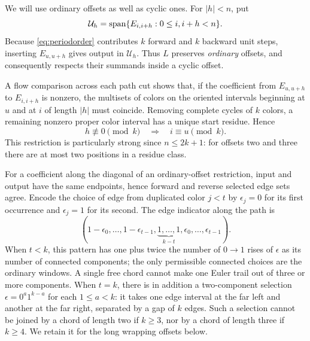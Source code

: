 We will use ordinary offsets as well as cyclic ones. For
$|h|<n$, put
\[
 \mathcal U_h=\operatorname{span}\{E_{i,i+h}:0\le i,i+h<n\}.
\]
Because \eqref{eq:periodorder} contributes $k$ forward and $k$
backward unit steps, inserting $E_{u,u+h}$ gives output in
$\mathcal U_h$. Thus $L$ preserves \emph{ordinary} offsets,
and consequently respects their summands inside a cyclic offset.

A flow comparison across each path cut shows that, if the
coefficient from $E_{u,u+h}$ to $E_{i,i+h}$ is nonzero, the
multisets of colors on the oriented intervals beginning at $u$
and at $i$ of length $|h|$ must coincide. Removing complete cycles
of $k$ colors, a remaining nonzero proper color interval has a
unique start residue. Hence
\begin{equation}\label{eq:colorresidue}
 h\not\equiv0\pmod k\quad\Longrightarrow\quad i\equiv u\pmod k.
\end{equation}
This restriction is particularly strong since $n\le2k+1$:
for offsets two and three there are at most two positions in a
residue class.

For a coefficient along the diagonal of an ordinary-offset
restriction, input and output have the same endpoints, hence
forward and reverse selected edge sets agree. Encode the choice
of edge from duplicated color $j<t$ by $\epsilon_j=0$ for its
first occurrence and $\epsilon_j=1$ for its second. The edge
indicator along the path is
\begin{equation}\label{eq:binary}
 (1-\epsilon_0,\ldots,1-\epsilon_{t-1},
 \underbrace{1,\ldots,1}_{k-t},
 \epsilon_0,\ldots,\epsilon_{t-1}).
\end{equation}
When $t<k$, this pattern has one plus twice the number of
$0\to1$ rises of $\epsilon$ as its number of connected
components; the only permissible connected choices are the
ordinary windows. A single free chord cannot make one Euler
trail out of three or more components. When $t=k$, there is in
addition a two-component selection
$\epsilon=0^a1^{k-a}$ for each $1\le a<k$:
it takes one edge interval at the far left and another at the far
right, separated by a gap of $k$ edges. Such a selection cannot
be joined by a chord of length two if $k\ge3$, nor by a chord
of length three if $k\ge4$. We retain it for the long wrapping
offsets below.

